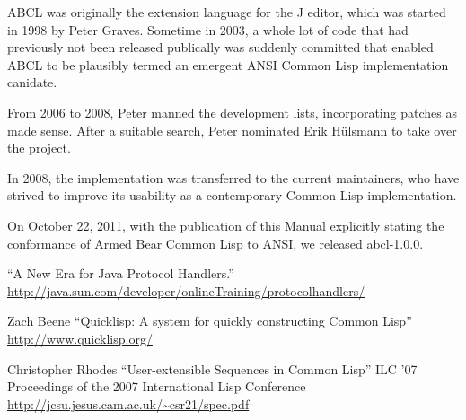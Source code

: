 \documentclass[10pt]{book}
\begin{document}
\textsc{ABCL} was originally the extension language for the J editor, which was
started in 1998 by Peter Graves.  Sometime in 2003, a whole lot of
code that had previously not been released publically was suddenly
committed that enabled ABCL to be plausibly termed an emergent ANSI
Common Lisp implementation canidate.

From 2006 to 2008, Peter manned the development lists, incorporating
patches as made sense.  After a suitable search, Peter nominated Erik
H\"{u}lsmann to take over the project.

In 2008, the implementation was transferred to the current
maintainers, who have strived to improve its usability as a
contemporary Common Lisp implementation.

On October 22, 2011, with the publication of this Manual explicitly
stating the conformance of Armed Bear Common Lisp to \textsc{ANSI}, we
released abcl-1.0.0.



\begin{thebibliography}{9}

\label{_:1}
  ``A New Era for Java Protocol Handlers.''
  \url{http://java.sun.com/developer/onlineTraining/protocolhandlers/}

\label{_:XACH2011}
  Zach Beene
  ``Quicklisp:  A system for quickly constructing Common Lisp''
  \url{http://www.quicklisp.org/}

Christopher Rhodes
``User-extensible Sequences in Common Lisp''
ILC '07 Proceedings of the 2007 International Lisp Conference
\url{http://jcsu.jesus.cam.ac.uk/~csr21/spec.pdf}

\end{thebibliography}

\printindex
\end{document}

